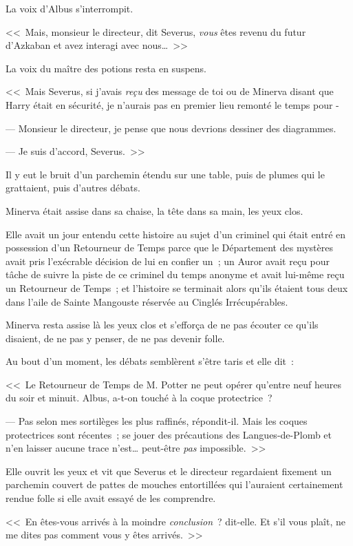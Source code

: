La voix d'Albus s'interrompit.

<<~Mais, monsieur le directeur, dit Severus, \emph{vous} êtes revenu du futur d'Azkaban et avez interagi avec nous…~>>

La voix du maître des potions resta en suspens.

<<~Mais Severus, si j'avais \emph{reçu} des message de toi ou de Minerva disant que Harry était en sécurité, je n'aurais pas en premier lieu remonté le temps pour -

--- Monsieur le directeur, je pense que nous devrions dessiner des diagrammes.

--- Je suis d'accord, Severus.~>>

Il y eut le bruit d'un parchemin étendu sur une table, puis de plumes qui le grattaient, puis d'autres débats.

Minerva était assise dans sa chaise, la tête dans sa main, les yeux clos.

Elle avait un jour entendu cette histoire au sujet d'un criminel qui était entré en possession d'un Retourneur de Temps parce que le Département des mystères avait pris l'exécrable décision de lui en confier un~; un Auror avait reçu pour tâche de suivre la piste de ce criminel du temps anonyme et avait lui-même reçu un Retourneur de Temps~; et l'histoire se terminait alors qu'ils étaient tous deux dans l'aile de Sainte Mangouste réservée au Cinglés Irrécupérables.

Minerva resta assise là les yeux clos et s'efforça de ne pas écouter ce qu'ils disaient, de ne pas y penser, de ne pas devenir folle.

Au bout d'un moment, les débats semblèrent s'être taris et elle dit~:

<<~Le Retourneur de Temps de M. Potter ne peut opérer qu'entre neuf heures du soir et minuit. Albus, a-t-on touché à la coque protectrice~?

--- Pas selon mes sortilèges les plus raffinés, répondit-il. Mais les coques protectrices sont récentes~; se jouer des précautions des Langues-de-Plomb et n'en laisser aucune trace n'est… peut-être \emph{pas} impossible.~>>

Elle ouvrit les yeux et vit que Severus et le directeur regardaient fixement un parchemin couvert de pattes de mouches entortillées qui l'auraient certainement rendue folle si elle avait essayé de les comprendre.

<<~En êtes-vous arrivés à la moindre \emph{conclusion}~? dit-elle. Et s'il vous plaît, ne me dites pas comment vous y êtes arrivés.~>>

